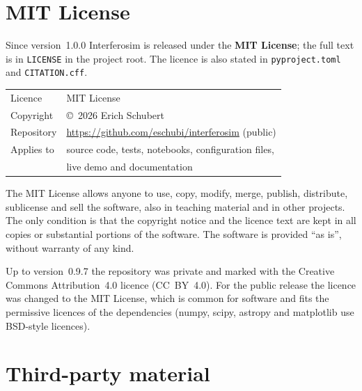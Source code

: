
\section{MIT License}

Since version~1.0.0 Interferosim is released under the \textbf{MIT
License}; the full text is in \texttt{LICENSE} in the project root. The
licence is also stated in \texttt{pyproject.toml} and
\texttt{CITATION.cff}.

\begin{center}
\begin{tabular}{@{}ll@{}}
\toprule
Licence & MIT License \\
Copyright & \copyright~2026 Erich Schubert \\
Repository & \url{https://github.com/eschubi/interferosim} (public) \\
Applies to & source code, tests, notebooks, configuration files, \\
           & live demo and documentation \\
\bottomrule
\end{tabular}
\end{center}

The MIT License allows anyone to use, copy, modify, merge, publish,
distribute, sublicense and sell the software, also in teaching material
and in other projects. The only condition is that the copyright notice
and the licence text are kept in all copies or substantial portions of
the software. The software is provided \enquote{as is}, without warranty
of any kind.

Up to version~0.9.7 the repository was private and marked with the
Creative Commons Attribution~4.0 licence (CC~BY~4.0). For the public
release the licence was changed to the MIT License, which is common for
software and fits the permissive licences of the dependencies (numpy,
scipy, astropy and matplotlib use BSD-style licences).

\section{Third-party material}

